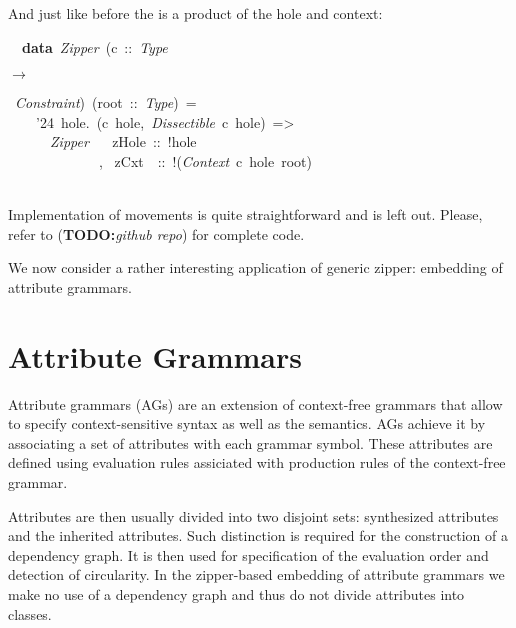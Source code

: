\documentclass[runningheads]{llncs}
\newcommand{\texfamily}{\fontfamily{cmtex}\selectfont}
\newcommand{\WithMath}[2]{{\parbox[][][b]{\widthof{#1}}{\centering$#2$}}}
\newcommand{\TODO}[1]{{\color[rgb]{1,0,0}\textbf{TODO:}\textit{#1}}}
\begin{document}
  And just like before the  is a product of the hole and context:
\begin{hscode}\SaveRestoreHook
~~{\bfseries data}~{\itshape Zipper}~(c~::~{\itshape Type}~\WithMath{->}{\rightarrow}~{\itshape Constraint})~(root~::~{\itshape Type})~=
\\
\texfamily ~~~~\char'24~hole.~(c~hole,~{\itshape Dissectible}~c~hole)~=>
\\
\texfamily ~~~~~~{\itshape Zipper}~ ~ zHole~::~!hole
\\
\texfamily ~~~~~~~~~~~~~,~ zCxt~~::~!({\itshape Context}~c~hole~root)
\\
\texfamily ~~~~~~~~~~~~~ 
\ColumnHook
\end{hscode}\resethooks

  Implementation of movements is quite straightforward and is left out. Please,
  refer to (\TODO{github repo}) for complete code.

  We now consider a rather interesting application of generic zipper: embedding of
  attribute grammars.

\section{Attribute Grammars}
  Attribute grammars (AGs) are an extension of context-free grammars that allow
  to specify context-sensitive syntax as well as the semantics. AGs achieve it
  by associating a set of attributes with each grammar symbol. These attributes
  are defined using evaluation rules assiciated with production rules of the
  context-free grammar.

  Attributes are then usually divided into two disjoint sets: synthesized
  attributes and the inherited attributes. Such distinction is required for the
  construction of a dependency graph. It is then used for specification of the
  evaluation order and detection of circularity. In the zipper-based embedding of
  attribute grammars we make no use of a dependency graph and thus do not divide
  attributes into classes.
\end{document}
